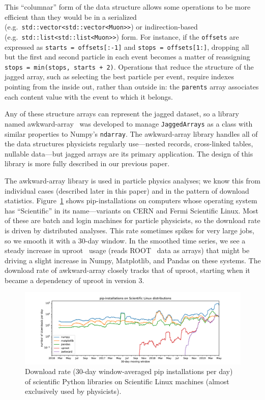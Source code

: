\documentclass[a4paper]{jpconf}
\begin{document}
This ``columnar'' form of the data structure allows some operations to be more efficient than they would be in a serialized (e.g.\ {\tt std::vector<std::vector<Muon>>}) or indirection-based (e.g.\ {\tt std::list<std::list<Muon>>}) form. For instance, if the {\tt offsets} are expressed as {\tt starts = offsets[:-1]} and {\tt stops = offsets[1:]}, dropping all but the first and second particle in each event becomes a matter of reassigning {\tt stops = min(stops, starts + 2)}. Operations that reduce the structure of the jagged array, such as selecting the best particle per event, require indexes pointing from the inside out, rather than outside in: the {\tt parents} array associates each content value with the event to which it belongs.

Any of these structure arrays can represent the jagged dataset, so a library named awkward-array~\cite{awkward} was developed to manage {\tt JaggedArrays} as a class with similar properties to Numpy's {\tt ndarray}. The awkward-array library handles all of the data structures physicists regularly use---nested records, cross-linked tables, nullable data---but jagged arrays are its primary application. The design of this library is more fully described in our previous paper\cite{2019EPJWC}.

The awkward-array library is used in particle physics analyses; we know this from individual cases (described later in this paper) and in the pattern of download statistics. Figure~\ref{fig:uproot} shows pip-installations on computers whose operating system has ``Scientific'' in its name---variants on CERN and Fermi Scientific Linux. Most of these are batch and login machines for particle physicists, so the download rate is driven by distributed analyses. This rate sometimes spikes for very large jobs, so we smooth it with a 30-day window. In the smoothed time series, we see a steady increase in uproot~\cite{uproot} usage (reads ROOT~\cite{root} data as arrays) that might be driving a slight increase in Numpy, Matplotlib, and Pandas on these systems. The download rate of awkward-array closely tracks that of uproot, starting when it became a dependency of uproot in version 3.

\begin{figure}
\includegraphics[width=\linewidth]{pip-scientificlinux-uproot.pdf}

\caption{Download rate (30-day window-averaged pip installations per day) of scientific Python libraries on Scientific Linux machines (almost exclusively used by physicists). \label{fig:uproot}}
\end{figure}
\end{document}
